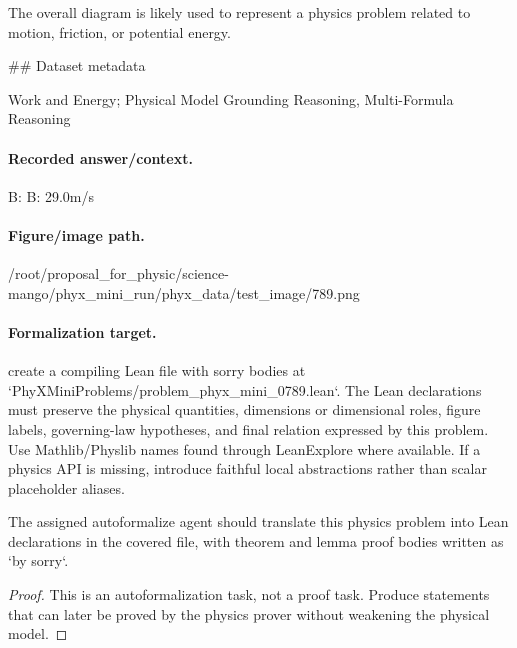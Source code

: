The overall diagram is likely used to represent a physics problem related to motion, friction, or potential energy.

\#\# Dataset metadata

Work and Energy; Physical Model Grounding Reasoning, Multi-Formula Reasoning

\paragraph{Recorded answer/context.}
B: B: 29.0m/s

\paragraph{Figure/image path.}
/root/proposal\_for\_physic/science-mango/phyx\_mini\_run/phyx\_data/test\_image/789.png

\paragraph{Formalization target.}
create a compiling Lean file with sorry bodies at `PhyXMiniProblems/problem\_phyx\_mini\_0789.lean`. The Lean declarations must preserve the physical quantities, dimensions or dimensional roles, figure labels, governing-law hypotheses, and final relation expressed by this problem.
Use Mathlib/Physlib names found through LeanExplore where available. If a physics API is missing, introduce faithful local abstractions rather than scalar placeholder aliases.

\begin{theorem}
\label{thm:physics:phyx_mini_0789:target}
The assigned autoformalize agent should translate this physics problem into Lean declarations in the covered file, with theorem and lemma proof bodies written as `by sorry`.
\end{theorem}
\begin{proof}
This is an autoformalization task, not a proof task. Produce statements that can later be proved by the physics prover without weakening the physical model.
\end{proof}

